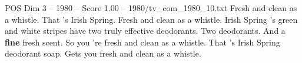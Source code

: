 \begin{textsample}{POS Dim 3 – 1980 – Score 1.00 – 1980/tv\_com\_1980\_10.txt}  \label{ex:f3_pos_056}
Fresh and clean as a whistle.
That 's Irish Spring.
Fresh and clean as a whistle.
Irish Spring 's green and white stripes have two truly effective deodorants.
Two deodorants.
And a \textbf{fine} fresh scent.
So you 're fresh and clean as a whistle.
That 's Irish Spring deodorant soap.
Gets you fresh and clean as a whistle.

\end{textsample}
